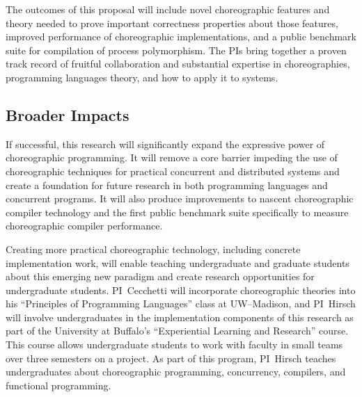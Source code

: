 The outcomes of this proposal will include novel choreographic features and theory needed to prove
important correctness properties about those features, improved performance of choreographic implementations,
and a public benchmark suite for compilation of process polymorphism.
The PIs bring together a proven track record of fruitful collaboration
and substantial expertise in choreographies, programming languages theory, and how to apply it to systems.

\subsection*{Broader Impacts}

If successful, this research will significantly expand the expressive power of choreographic programming.
It will remove a core barrier impeding the use of choreographic techniques for practical concurrent and distributed systems
and create a foundation for future research in both programming languages and concurrent programs.
It will also produce improvements to nascent choreographic compiler technology
and the first public benchmark suite specifically to measure choreographic compiler performance.

Creating more practical choreographic technology, including concrete implementation work,
will enable teaching undergraduate and graduate students about this emerging new paradigm
and create research opportunities for undergraduate students.
PI~Cecchetti will incorporate choreographic theories into his ``Principles of Programming Languages'' class at UW--Madison,
and PI~Hirsch will involve undergraduates in the implementation components of this research as part of the University at Buffalo's ``Experiential Learning and Research'' course.
This course allows undergraduate students to work with faculty in small teams over three semesters on a project.
As part of this program, PI~Hirsch teaches undergraduates about choreographic programming, concurrency, compilers, and functional programming.





